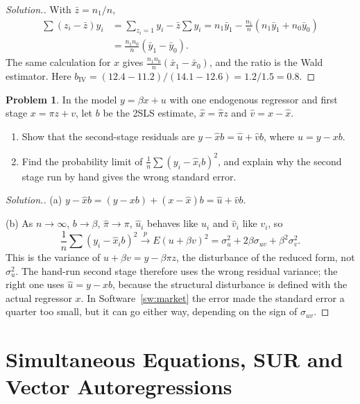 \documentclass[11pt,a4paper]{article}
\numberwithin{equation}{section}
\theoremstyle{definition}
\newtheorem{problemx}{Problem}[subsection]
\newenvironment{problem}{\begin{problemx}}{\end{problemx}}
\newenvironment{solution}
  {\renewcommand{\qedsymbol}{}\begin{proof}[\textit{Solution}.]}
  {\end{proof}}
\begin{document}
\begin{solution}
With $\bar z = n_1/n$,
\begin{align*}
\sum(z_i - \bar z)y_i &= \sum_{z_i = 1}y_i - \bar z\sum y_i = n_1\bar y_1 - \frac{n_1}{n}(n_1\bar y_1 + n_0\bar y_0)\\
&= \frac{n_1n_0}{n}(\bar y_1 - \bar y_0) .
\end{align*}
The same calculation for $x$ gives
$\frac{n_1n_0}{n}(\bar x_1 - \bar x_0)$, and the ratio is the Wald estimator. Here $b_{\text{IV}} = (12.4 - 11.2)/(14.1 - 12.6) = 1.2/1.5 = 0.8$.
\end{solution}

\begin{problem}
\label{prob:secondstage}
In the model $y = \beta x + u$ with one endogenous regressor and first stage $x = \pi z + v$, let $b$ be the 2SLS estimate, $\hat x = \hat\pi z$ and $\hat v = x - \hat x$.
\begin{enumerate}[label=(\alph*)]
\item Show that the second-stage residuals are $y - \hat xb = \hat u + \hat vb$, where $\hat u = y - xb$.
\item Find the probability limit of $\frac1n\sum(y_i - \hat x_ib)^2$, and explain why the second stage run by hand gives the wrong standard error.
\end{enumerate}
\end{problem}

\begin{solution}
(a) $y - \hat xb = (y - xb) + (x - \hat x)b = \hat u + \hat vb$.

(b) As $n \to \infty$, $b \to \beta$, $\hat\pi \to \pi$, $\hat u_i$ behaves like $u_i$ and $\hat v_i$ like $v_i$, so
\[
\frac1n\sum(y_i - \hat x_ib)^2 \xrightarrow{p} E(u + \beta v)^2 = \sigma_u^2 + 2\beta\sigma_{uv} + \beta^2\sigma_v^2 .
\]
This is the variance of $u + \beta v = y - \beta\pi z$, the disturbance of the reduced form, not $\sigma_u^2$. The hand-run second stage therefore uses the wrong
residual variance; the right one uses $\hat u = y - xb$, because the structural disturbance is defined with the actual regressor $x$. In
Software~\ref{sw:market} the error made the standard error a quarter too small, but it can go either way, depending on the sign of $\sigma_{uv}$.
\end{solution}

\section{Simultaneous Equations, SUR and Vector Autoregressions}
\label{sec:systems}
\end{document}
